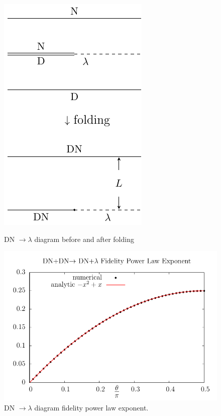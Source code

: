 \documentclass{article}
\begin{document}
\begin{figure}[h]
\begin{minipage}[t]{0.3\linewidth}
\centering
\includegraphics[width=	extwidth]{fig_DN-lambda-folding}\caption{DN $\rightarrow \lambda$ diagram before and after folding}
\label{fig:DN-lambda-folding}
\end{minipage}
\hfill
\begin{minipage}[t]{0.65\linewidth}
\centering
\includegraphics[width=\textwidth]{DN_DN2tan.pdf}
\caption{DN $\rightarrow \lambda$ diagram fidelity power law exponent.}
\end{minipage}
\end{figure}
\end{document}
